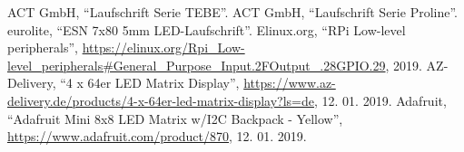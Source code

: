\documentclass[conference]{IEEEtran}
\begin{document}
\begin{thebibliography}{00}
  ACT GmbH,
  ``Laufschrift Serie TEBE''.
  ACT GmbH,
  ``Laufschrift Serie Proline''.
  eurolite,
  ``ESN 7x80 5mm LED-Laufschrift''.
  Elinux.org,
  ``RPi Low-level peripherals'',
  \url{https://elinux.org/Rpi_Low-level_peripherals#General_Purpose_Input.2FOutput_.28GPIO.29},
  2019.
  AZ-Delivery,
  ``4 x 64er LED Matrix Display'',
  \url{https://www.az-delivery.de/products/4-x-64er-led-matrix-display?ls=de},
  12. 01. 2019.
  Adafruit,
  ``Adafruit Mini 8x8 LED Matrix w/I2C Backpack - Yellow'',
  \url{https://www.adafruit.com/product/870},
  12. 01. 2019.
\end{thebibliography}
\end{document}
